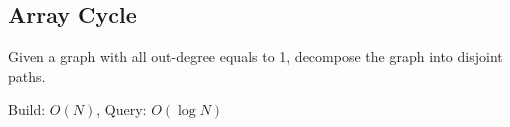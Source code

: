 \subsection{Array Cycle}

Given a graph with all out-degree equals to 1, decompose the graph into disjoint paths.

Build: $O(N)$, Query: $O(\log{N})$
